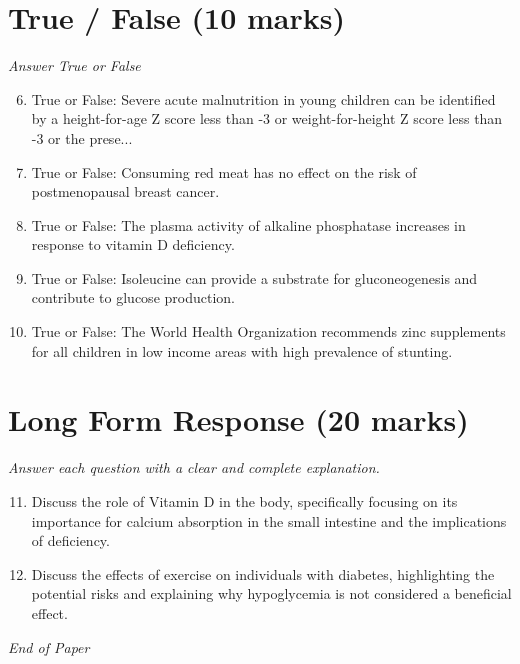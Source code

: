 \documentclass[12pt]{article}
\begin{document}
\section*{True / False (10 marks)}
\textit{Answer True or False}
\begin{enumerate}[label=\arabic*.]
\setcounter{enumi}{5}
\item True or False: Severe acute malnutrition in young children can be identified by a height-for-age Z score less than -3 or weight-for-height Z score less than -3 or the prese...
\item True or False: Consuming red meat has no effect on the risk of postmenopausal breast cancer.
\item True or False: The plasma activity of alkaline phosphatase increases in response to vitamin D deficiency.
\item True or False: Isoleucine can provide a substrate for gluconeogenesis and contribute to glucose production.
\item True or False: The World Health Organization recommends zinc supplements for all children in low income areas with high prevalence of stunting.
\end{enumerate}

\section*{Long Form Response (20 marks)}
\textit{Answer each question with a clear and complete explanation.}
\begin{enumerate}[label=\arabic*.]
\setcounter{enumi}{10}
\item Discuss the role of Vitamin D in the body, specifically focusing on its importance for calcium absorption in the small intestine and the implications of deficiency.
\item Discuss the effects of exercise on individuals with diabetes, highlighting the potential risks and explaining why hypoglycemia is not considered a beneficial effect.
\end{enumerate}

\vfill
\noindent\textit{End of Paper}
\end{document}
